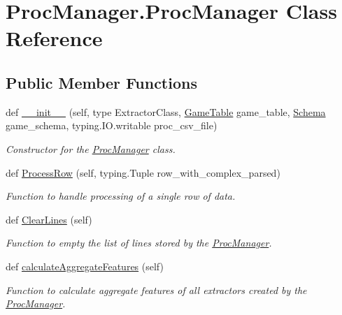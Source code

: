 \hypertarget{class_proc_manager_1_1_proc_manager}{}\section{Proc\+Manager.\+Proc\+Manager Class Reference}
\label{class_proc_manager_1_1_proc_manager}
\subsection*{Public Member Functions}
\begin{DoxyCompactItemize}
\item 
def \mbox{\hyperlink{class_proc_manager_1_1_proc_manager_a9fd37c5df3f1f4af41d9eccd8fe5f7fb}{\+\_\+\+\_\+init\+\_\+\+\_\+}} (self, type Extractor\+Class, \mbox{\hyperlink{class_game_table}{Game\+Table}} game\+\_\+table, \mbox{\hyperlink{classschemas_1_1_schema_1_1_schema}{Schema}} game\+\_\+schema, typing.\+I\+O.\+writable proc\+\_\+csv\+\_\+file)
\begin{DoxyCompactList}\small\item\em Constructor for the \mbox{\hyperlink{class_proc_manager_1_1_proc_manager}{Proc\+Manager}} class. \end{DoxyCompactList}\item 
def \mbox{\hyperlink{class_proc_manager_1_1_proc_manager_a74911cffd1679201bde8401b34d89af0}{Process\+Row}} (self, typing.\+Tuple row\+\_\+with\+\_\+complex\+\_\+parsed)
\begin{DoxyCompactList}\small\item\em Function to handle processing of a single row of data. \end{DoxyCompactList}\item 
def \mbox{\hyperlink{class_proc_manager_1_1_proc_manager_a672b24c4a817fc8cc7d4c1dafb47d6b8}{Clear\+Lines}} (self)
\begin{DoxyCompactList}\small\item\em Function to empty the list of lines stored by the \mbox{\hyperlink{class_proc_manager_1_1_proc_manager}{Proc\+Manager}}. \end{DoxyCompactList}\item 
def \mbox{\hyperlink{class_proc_manager_1_1_proc_manager_a5961b8a9141b674e42921cb8a3866a72}{calculate\+Aggregate\+Features}} (self)
\begin{DoxyCompactList}\small\item\em Function to calculate aggregate features of all extractors created by the \mbox{\hyperlink{class_proc_manager_1_1_proc_manager}{Proc\+Manager}}. \end{DoxyCompactList}\item 

\end{DoxyCompactItemize}
